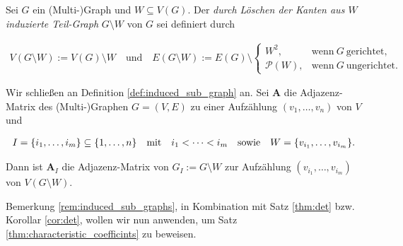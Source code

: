             \begin{definition} \label{def:induced_sub_graph}
                
                Sei $G$ ein (Multi-)Graph und $W \subseteq V(G)$.
                Der \textit{durch Löschen der Kanten aus $W$ induzierte Teil-Graph} $G \setminus W$ von $G$ sei definiert durch

                \begin{align*}
                    V(G \setminus W) := V(G) \setminus W
                    \quad
                    \text{und}
                    \quad
                    E(G \setminus W)
                    :=
                    E(G) \setminus
                    \begin{cases}
                        W^2,
                        & \text{wenn} ~ G ~ \text{gerichtet}, \\
                        \mathcal P(W),
                        & \text{wenn} ~ G ~ \text{ungerichtet}.
                    \end{cases}
                \end{align*}

            \end{definition}

            \begin{remark} \label{rem:induced_sub_graphs}

                Wir schließen an Definition \ref{def:induced_sub_graph} an.
                Sei $\mathbf A$ die Adjazenz-Matrix des (Multi-)Graphen $G = (V, E)$ zu einer Aufzählung $(v_1, \dots, v_n)$ von $V$ und

                \begin{align*}
                    I = {\left \{ i_1, \dots, i_m \right \}} \subseteq {\left \{ 1, \dots, n \right \}}
                    \quad
                    \text{mit}
                    \quad
                    i_1 < \cdots < i_m
                    \quad
                    \text{sowie}
                    \quad
                    W = {\left \{ v_{i_1}, \dots, v_{i_m} \right \}}.
                \end{align*}

                Dann ist $\mathbf A_I$ die Adjazenz-Matrix von $G_I := G \setminus W$ zur Aufzählung $(v_{i_1}, \dots, v_{i_m})$ von $V(G \setminus W)$.
                
            \end{remark}

            Bemerkung \ref{rem:induced_sub_graphs}, in Kombination mit Satz \ref{thm:det} bzw. Korollar \ref{cor:det}, wollen wir nun anwenden, um Satz \ref{thm:characteristic_coefficints} zu beweisen.

